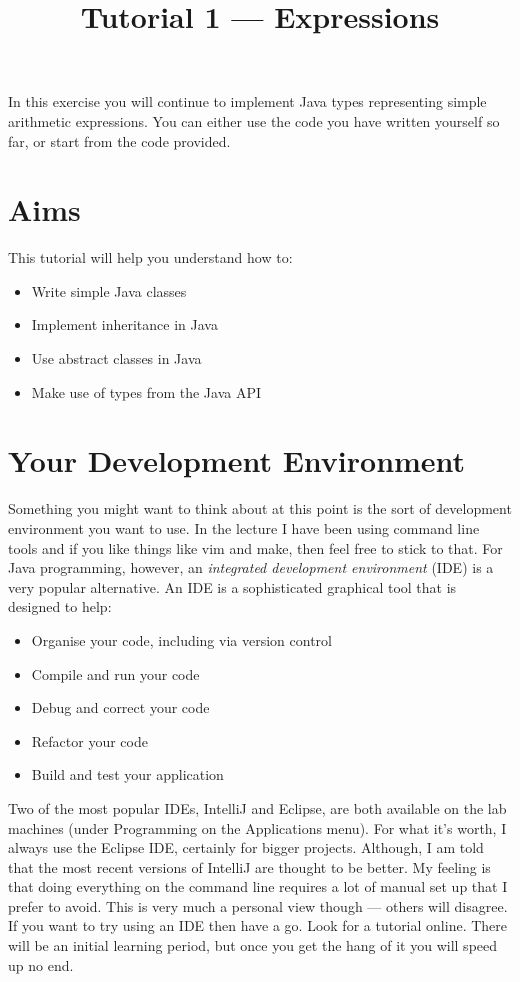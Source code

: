 \documentclass[11pt,a4paper]{article}
\title{Tutorial 1 --- Expressions}
\date{}
\begin{document}
 
\maketitle


In this exercise you will continue to implement Java types representing
simple arithmetic expressions.
You can either use the code you have written yourself so far,
or start from the code provided.

\section{Aims}

This tutorial will help you understand how to: 

\begin{itemize}
  \item Write simple Java classes
  \item Implement inheritance in Java
  \item Use abstract classes in Java
  \item Make use of types from the Java API
\end{itemize}

 
\section{Your Development Environment}
 
Something you might want to think about at this point is the sort of
development environment you want to use.
In the lecture I have been using command line tools and if you like things
like vim and make, then feel free to stick to that.
For Java programming, however,
an \emph{integrated development environment} (IDE) is a very popular 
alternative.
An IDE is a sophisticated graphical tool that is designed to help:

\begin{itemize}
  \item Organise your code, including via version control
  \item Compile and run your code
  \item Debug and correct your code
  \item Refactor your code
  \item Build and test your application
\end{itemize}

Two of the most popular IDEs, IntelliJ and Eclipse, are both available on the 
lab machines (under Programming on the Applications menu).
For what it's worth, I always use the Eclipse IDE, certainly for bigger projects.
Although, I am told that the most recent versions of IntelliJ are thought to be
better.
My feeling is that doing everything on the command line requires a lot of
manual set up that I prefer to avoid.
This is very much a personal view though --- others will disagree.
If you want to try using an IDE then have a go.
Look for a tutorial online.
There will be an initial learning period,
but once you get the hang of it you will speed up no end.
\end{document}
